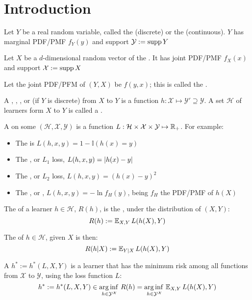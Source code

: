 \section{Introduction}

Let $Y$ be a real random variable, called the  (discrete) or the  (continuous). $Y$ has marginal PDF/PMF $f_Y(y)$ and support  $\mathcal{Y}:=\operatorname{supp}{Y}$\medskip 

Let $X$ be a $d$-dimensional random vector of the . It has joint PDF/PMF $f_X(x)$ and support $\mathcal{X}:=\operatorname{supp}{X}$\medskip

Let the joint PDF/PFM of $(Y,X)$ be $f(y,x)$; this is called the .\medskip

A , , ,  or  (if $Y$ is discrete) from $X$ to $Y$ is a function $h:\mathcal{X}\mapsto\mathcal{Y}'\supseteq \mathcal{Y}$. A set $\mathcal{H}$ of learners form $X$ to $Y$ is called a .\medskip

A  on some $(\mathcal{H},\mathcal{X},\mathcal{Y})$ is a function $L:\mathcal{H}\times \mathcal{X}\times\mathcal{Y}\mapsto \operatorname{\mathbb{R}}_+$. For example:

\begin{itemize}
    \item The  is $L(h,{x},y)=1-\mathbb{I}(h({x})=y)$
    \item The , or $L_1 $ loss, $L(h,{x},y)=\abs{h({x})-y}$
    \item The , or $L_2$ loss, $L(h,{x},y)=(h({x})-y)^2$
    \item The , or , $L(h,x,y)=-\ln f_H(y)$, being $f_H$ the PDF/PMF of $h(X)$
\end{itemize}

The  of a learner $h\in\mathcal{H}$, $R(h)$, is the , under the distribution of $(X,Y)$:
\begin{equation*}
    R(h) := \operatorname{\mathbb{E}}_{X,Y} L(h(X),Y)
\end{equation*}

The  of $h\in\mathcal{H}$, given $X$ is then:
\begin{equation*}
    R(h|X) := \operatorname{\mathbb{E}}_{Y|X} L(h(X),Y)
\end{equation*}

A  $h^{*}:=h^*(L,X,Y)$ is a learner that has the minimum risk among all functions from $\mathcal{X}$ to $\mathcal{Y}$, using the loss function $L$:
\begin{equation*}
    h^{*}:=h^*(L,X,Y) \in \operatorname*{arg\,inf\,}_{h\in \mathcal{Y}^\mathcal{X}} R(h) = \operatorname*{arg\,inf\,}_{h\in\mathcal{Y}^\mathcal{X}} \operatorname{\mathbb{E}}_{X,Y} L(h(X),Y)
\end{equation*}

